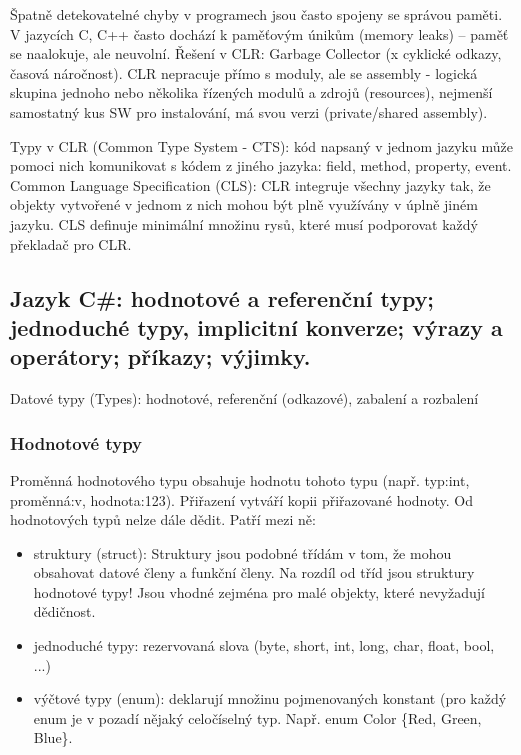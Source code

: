 Špatně detekovatelné chyby v programech jsou často spojeny se správou paměti. V jazycích C, C++ často dochází k paměťovým únikům (memory leaks) – paměť se naalokuje, ale neuvolní. Řešení v CLR: Garbage Collector (x cyklické odkazy, časová náročnost). CLR nepracuje přímo s moduly, ale se assembly - logická skupina jednoho nebo několika řízených modulů a zdrojů (resources), nejmenší samostatný kus SW pro instalování, má svou verzi (private/shared assembly).

Typy v CLR (Common Type System - CTS): kód napsaný v jednom jazyku může pomoci nich komunikovat s kódem z jiného jazyka: field, method, property, event. Common Language Specification (CLS): CLR integruje všechny jazyky tak, že objekty vytvořené v jednom z nich mohou být plně využívány v úplně jiném jazyku. CLS definuje minimální množinu rysů, které musí podporovat každý překladač pro CLR.

\subsection{Jazyk C\#: hodnotové a referenční typy; jednoduché typy, implicitní konverze; výrazy a operátory; příkazy; výjimky.}
Datové typy (Types): hodnotové, referenční (odkazové), zabalení a rozbalení

\subsubsection*{Hodnotové typy}
Proměnná hodnotového typu obsahuje hodnotu tohoto typu (např. typ:int, proměnná:v, hodnota:123). Přiřazení vytváří kopii přiřazované hodnoty. Od hodnotových typů nelze dále dědit. Patří mezi ně:
\begin{itemize}
\item struktury (struct): Struktury jsou podobné třídám v tom, že mohou obsahovat datové členy a funkční členy. Na rozdíl od tříd jsou struktury hodnotové typy! Jsou vhodné zejména pro malé objekty, které nevyžadují dědičnost.
\item jednoduché typy: rezervovaná slova (byte, short, int, long, char, float, bool, ...)
\item výčtové typy (enum): deklarují množinu pojmenovaných konstant (pro každý enum je v pozadí nějaký celočíselný typ. Např. enum Color \{Red, Green, Blue\}.
\end{itemize}

